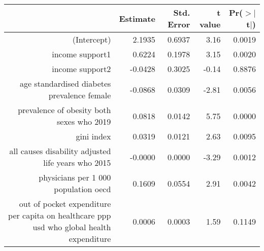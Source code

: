 \begin{table}[ht]
\centering
\begin{tabular}{rrrrr}
  \hline
 & Estimate & Std. Error & t value & Pr($>$$|$t$|$) \\ 
  \hline
(Intercept) & 2.1935 & 0.6937 & 3.16 & 0.0019 \\ 
  income support1 & 0.6224 & 0.1978 & 3.15 & 0.0020 \\ 
  income support2 & -0.0428 & 0.3025 & -0.14 & 0.8876 \\ 
  age standardised diabetes prevalence female & -0.0868 & 0.0309 & -2.81 & 0.0056 \\ 
  prevalence of obesity both sexes who 2019 & 0.0818 & 0.0142 & 5.75 & 0.0000 \\ 
  gini index & 0.0319 & 0.0121 & 2.63 & 0.0095 \\ 
  all causes disability adjusted life years who 2015 & -0.0000 & 0.0000 & -3.29 & 0.0012 \\ 
  physicians per 1 000 population oecd & 0.1609 & 0.0554 & 2.91 & 0.0042 \\ 
  out of pocket expenditure per capita on healthcare ppp usd who global health expenditure & 0.0006 & 0.0003 & 1.59 & 0.1149 \\ 
   \hline
\end{tabular}
\end{table}
